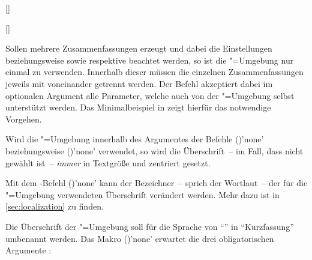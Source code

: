 \begin{Declaration*}{}
\begin{Declaration*}{}
\begin{Declaration*}{}
\begin{Declaration}{[]}
\begin{Declaration}{[]}
\begin{Declaration}{}
\begin{Declaration}[v2.02]{}
\begin{Declaration}[v2.02]{%
}
\begin{Declaration}{}
\begin{Declaration}{}{%
}
Sollen mehrere Zusammenfassungen erzeugt und dabei die Einstellungen 
 beziehungsweise  sowie 
 respektive  beachtet werden, so 
ist die "=Umgebung nur einmal zu verwenden. Innerhalb 
dieser müssen die einzelnen Zusammenfassungen jeweils mit  
voneinander getrennt werden. Der Befehl akzeptiert dabei im optionalen Argument 
alle Parameter, welche auch von der "=Umgebung selbst 
unterstützt werden. Das Minimalbeispiel in  
zeigt hierfür das notwendige Vorgehen.

Wird die "=Umgebung innerhalb des Argumentes der Befehle 
()'none' beziehungsweise 
()'none' verwendet, so wird die 
Überschrift~-- im Fall, dass nicht  gewählt ist~-- 
\emph{immer} in Textgröße und zentriert gesetzt.
\end{Declaration}
\end{Declaration}
\end{Declaration}
\end{Declaration}
\end{Declaration}
\end{Declaration}
\end{Declaration}

Mit dem \KOMAScript-Befehl ()'none'
kann der Bezeichner~-- sprich der Wortlaut~-- der für die 
"=Umgebung verwendeten Überschrift verändert werden. Mehr 
dazu ist in \autoref{sec:localization} zu finden.
%
\begin{Example}
Die Überschrift der "=Umgebung soll für die Sprache 
 von \enquote{\abstractname} in \enquote{Kurzfassung} umbenannt 
werden. Das Makro ()'none' 
erwartet die drei obligatorischen Argumente 
:
\begin{Code}[escapechar=§]
\end{Code}
%
\end{Example}



\end{Declaration*}
\end{Declaration*}
\end{Declaration*}

